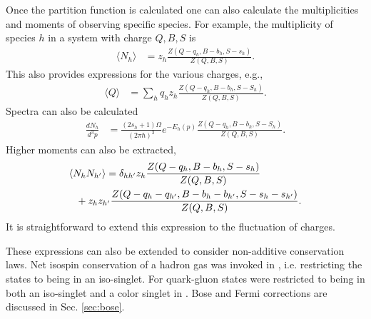 Once the partition function is calculated one can also calculate the multiplicities and moments of observing specific species. For example, the multiplicity of species $h$ in a system with charge $Q,B,S$ is
\begin{eqnarray}
\langle N_h\rangle &= z_h\frac{Z(Q-q_h,B-b_h,S-s_h)}{Z(Q,B,S)}.
\end{eqnarray}
This also provides expressions for the various charges, e.g.,
\begin{eqnarray}
\langle Q\rangle &= \sum_h q_hz_h\frac{Z(Q-q_h,B-b_h,S-S_h)}{Z(Q,B,S)}.
\end{eqnarray}
Spectra can also be calculated
\begin{eqnarray}
\frac{dN_h}{d^3p}&=\frac{(2s_h+1)\Omega}{(2\pi\hbar)^3}e^{-E_h(p)}\frac{Z(Q-q_h,B-b_h,S-S_h)}{Z(Q,B,S)}.
\end{eqnarray}
Higher moments can also be extracted,
\begin{eqnarray}
\langle N_hN_{h'}\rangle &= \delta_{hh'}z_h\frac{Z(Q-q_h,B-b_h,S-s_h)}{Z(Q,B,S)}\\
&\hspace*{-30pt}+z_hz_{h'}\frac{Z(Q-q_h-q_{h'},B-b_h-b_{h'},S-s_h-s_{h'})}{Z(Q,B,S)}.
\end{eqnarray}
It is straightforward to extend this expression to the fluctuation of charges.

These expressions can also be extended to consider non-additive conservation laws. Net isospin conservation of a hadron gas was invoked in \cite{Cheng:2002jb}, i.e. restricting the states to being in an iso-singlet.  For quark-gluon states were restricted to being in both an iso-singlet and a color singlet in \cite{Pratt:2003jd}. Bose and Fermi corrections are discussed in Sec. \ref{sec:bose}.

